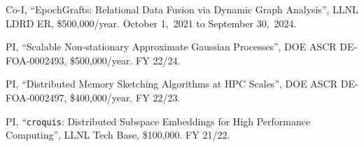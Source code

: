 \item Co-I,
	``EpochGrafts: Relational Data Fusion via Dynamic Graph Analysis'',
	LLNL LDRD ER,
	\$500,000/year.
	October 1,~2021 to September 30,~2024.

\item PI,
	``Scalable Non-stationary Approximate Gaussian Processes'',
	DOE ASCR DE-FOA-0002493,
	\$500,000/year.
	FY 22/24.

\item PI,
	``Distributed Memory Sketching Algorithms at HPC Scales'',
	DOE ASCR DE-FOA-0002497,
	\$400,000/year.
	FY 22/23.

\item PI,
	``\texttt{croquis}: Distributed Subspace Embeddings for High Performance Computing'',
	LLNL Tech Base,
	\$100,000.
	FY 21/22.

